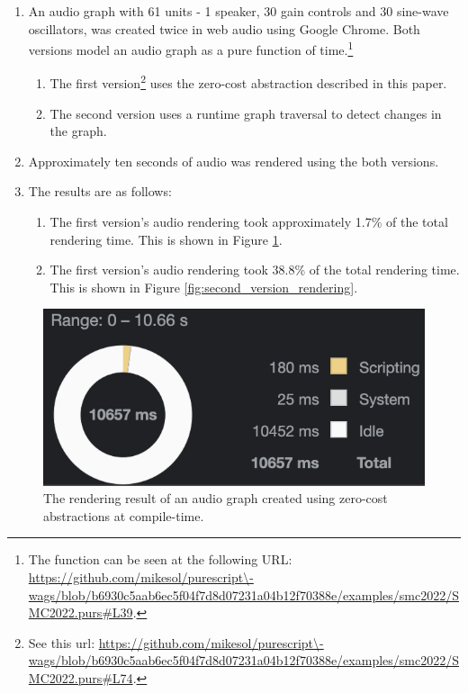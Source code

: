 \documentclass{article}
\begin{document}
\begin{enumerate}
  \item An audio graph with 61 units - 1 speaker, 30 gain controls and 30 sine-wave oscillators, was created twice in web audio using Google Chrome. Both versions model an audio graph as a pure function of time.\footnote{The function can be seen at the following URL: \url{https://github.com/mikesol/purescript\-wags/blob/b6930c5aab6ec5f04f7d8d07231a04b12f70388e/examples/smc2022/SMC2022.purs\#L39}.}
  \begin{enumerate}[label*=\arabic*.]
    \item The first version\footnote{See this url: \url{https://github.com/mikesol/purescript\-wags/blob/b6930c5aab6ec5f04f7d8d07231a04b12f70388e/examples/smc2022/SMC2022.purs\#L74}.} uses the zero-cost abstraction described in this paper.
    \item The second version uses a runtime graph traversal to detect changes in the graph.
  \end{enumerate}
  \item Approximately ten seconds of audio was rendered using the both versions.
  \item The results are as follows:
  \begin{enumerate}[label*=\arabic*.]
    \item The first version's audio rendering took approximately 1.7\% of the total rendering time. This is shown in Figure \ref{fig:first_version_rendering}.
    \item The first version's audio rendering took 38.8\% of the total rendering time. This is shown in Figure \ref{fig:second_version_rendering}.
  \end{enumerate}
\end{enumerate}


\begin{figure}[t]
\centering
\includegraphics[width=0.6\columnwidth]{fast}
\caption{The rendering result of an audio graph created using zero-cost abstractions at compile-time.\label{fig:first_version_rendering}}
\end{figure}
\end{document}
